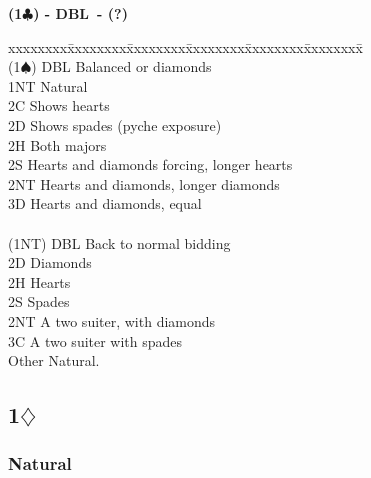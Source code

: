 \documentclass[10pt]{article}
\renewcommand{\c}{$\clubsuit$}
\renewcommand{\d}{$\diamondsuit$}
\newcommand{\s}{$\spadesuit$}
\newcommand{\x}{DBL}
\newenvironment{bidtable}[1][]
{\textbf{#1}
  \begin{adjustwidth}{1em}{}
    \addvspace{2pt}
    \begin{tabbing}
      xxxxxxxx\=xxxxxxxx\=xxxxxxxx\=xxxxxxxx\=xxxxxxxx\=xxxxxxxx\=\kill}
{\end{tabbing}\end{adjustwidth}\bigskip}%
\newcommand{\pdfd}{\texorpdfstring{\d{}}{D}}
\begin{document}
\begin{multicols*}{2}
\begin{bidtable}[(1\c) - \x\ - (?)]
                                                              \\
(1\s)  \> DBL   \> Balanced or diamonds                       \\
       \> 1NT   \> Natural                                    \\
       \> 2C    \> Shows hearts                               \\
       \> 2D    \> Shows spades (pyche exposure)              \\
       \> 2H    \> Both majors                                \\
       \> 2S    \> Hearts and diamonds forcing, longer hearts \\
       \> 2NT   \> Hearts and diamonds, longer diamonds       \\
       \> 3D    \> Hearts and diamonds, equal                 \\
                                                              \\
(1NT)  \> DBL   \> Back to normal bidding                     \\
       \> 2D    \> Diamonds                                   \\
       \> 2H    \> Hearts                                     \\
       \> 2S    \> Spades                                     \\
       \> 2NT   \> A two suiter, with diamonds                \\
       \> 3C    \> A two suiter with spades                   \\
       \> Other \> Natural.
\end{bidtable}

\subsection{1\pdfd}

\subsubsection{Natural}


\end{multicols*}
\end{document}
